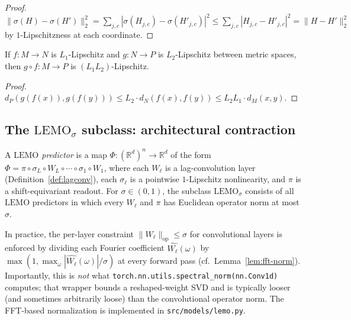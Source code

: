 \begin{proof}
$\|\sigma(H) - \sigma(H')\|_2^2 = \sum_{j, c} |\sigma(H_{j,c}) - \sigma(H'_{j,c})|^2
\le \sum_{j, c} |H_{j,c} - H'_{j,c}|^2 = \|H - H'\|_2^2$ by
$1$-Lipschitzness at each coordinate.
\end{proof}

\begin{lemma}
\label{lem:composition-lip}
If $f : M \to N$ is $L_1$-Lipschitz and $g : N \to P$ is $L_2$-Lipschitz
between metric spaces, then $g \circ f : M \to P$ is
$(L_1 L_2)$-Lipschitz.
\end{lemma}

\begin{proof}
$d_P(g(f(x)), g(f(y))) \le L_2 \cdot d_N(f(x), f(y)) \le L_2 L_1 \cdot d_M(x, y)$.
\end{proof}

\subsection{The $\mathrm{LEMO}_\sigma$ subclass: architectural contraction}

\begin{definition}
\label{def:lemo-sigma}
A \emph{$\mathrm{LEMO}$ predictor} is a map $\Phi : (\mathbb{R}^d)^n \to \mathbb{R}^d$
of the form $\Phi = \pi \circ \sigma_L \circ W_L \circ \cdots \circ
\sigma_1 \circ W_1$, where each $W_\ell$ is a lag-convolution layer
(Definition~\ref{def:lagconv}), each $\sigma_\ell$ is a pointwise
$1$-Lipschitz nonlinearity, and $\pi$ is a shift-equivariant readout.
For $\sigma \in (0, 1)$, the subclass $\mathrm{LEMO}_\sigma$ consists of
all $\mathrm{LEMO}$ predictors in which every $W_\ell$ and $\pi$ has Euclidean
operator norm at most $\sigma$.
\end{definition}

In practice, the per-layer constraint $\|W_\ell\|_\mathrm{op} \le \sigma$
for convolutional layers is enforced by dividing each Fourier coefficient
$\hat{W_\ell}(\omega)$ by $\max(1, \max_\omega |\hat{W_\ell}(\omega)|/\sigma)$
at every forward pass (cf.~Lemma~\ref{lem:fft-norm}).  Importantly,
this is \emph{not} what
\texttt{torch.nn.utils.spectral\_norm(nn.Conv1d)} computes; that
wrapper bounds a reshaped-weight SVD and is typically looser (and sometimes
arbitrarily loose) than the convolutional operator norm.  The FFT-based
normalization is implemented in \texttt{src/models/lemo.py}.

